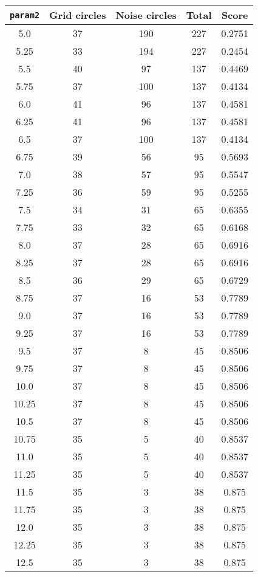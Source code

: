 \documentclass[letterpaper, 12pt]{article}
\begin{document}
\begin{longtable}{|c|c|c|c|c|}
\hline
\textbf{\texttt{param2}} & \textbf{Grid circles} & \textbf{Noise circles} & \textbf{Total} & \textbf{Score} \\
\hline
5.0 & 37 & 190 & 227 & 0.2751 \\
\hline
5.25 & 33 & 194 & 227 & 0.2454 \\
\hline
5.5 & 40 & 97 & 137 & 0.4469 \\
\hline
5.75 & 37 & 100 & 137 & 0.4134 \\
\hline
6.0 & 41 & 96 & 137 & 0.4581 \\
\hline
6.25 & 41 & 96 & 137 & 0.4581 \\
\hline
6.5 & 37 & 100 & 137 & 0.4134 \\
\hline
6.75 & 39 & 56 & 95 & 0.5693 \\
\hline
7.0 & 38 & 57 & 95 & 0.5547 \\
\hline
7.25 & 36 & 59 & 95 & 0.5255 \\
\hline
7.5 & 34 & 31 & 65 & 0.6355 \\
\hline
7.75 & 33 & 32 & 65 & 0.6168 \\
\hline
8.0 & 37 & 28 & 65 & 0.6916 \\
\hline
8.25 & 37 & 28 & 65 & 0.6916 \\
\hline
8.5 & 36 & 29 & 65 & 0.6729 \\
\hline
8.75 & 37 & 16 & 53 & 0.7789 \\
\hline
9.0 & 37 & 16 & 53 & 0.7789 \\
\hline
9.25 & 37 & 16 & 53 & 0.7789 \\
\hline
9.5 & 37 & 8 & 45 & 0.8506 \\
\hline
9.75 & 37 & 8 & 45 & 0.8506 \\
\hline
10.0 & 37 & 8 & 45 & 0.8506 \\
\hline
10.25 & 37 & 8 & 45 & 0.8506 \\
\hline
10.5 & 37 & 8 & 45 & 0.8506 \\
\hline
10.75 & 35 & 5 & 40 & 0.8537 \\
\hline
11.0 & 35 & 5 & 40 & 0.8537 \\
\hline
11.25 & 35 & 5 & 40 & 0.8537 \\
\hline
11.5 & 35 & 3 & 38 & 0.875 \\
\hline
11.75 & 35 & 3 & 38 & 0.875 \\
\hline
12.0 & 35 & 3 & 38 & 0.875 \\
\hline
12.25 & 35 & 3 & 38 & 0.875 \\
\hline
12.5 & 35 & 3 & 38 & 0.875 \\

\end{longtable}
\end{document}
